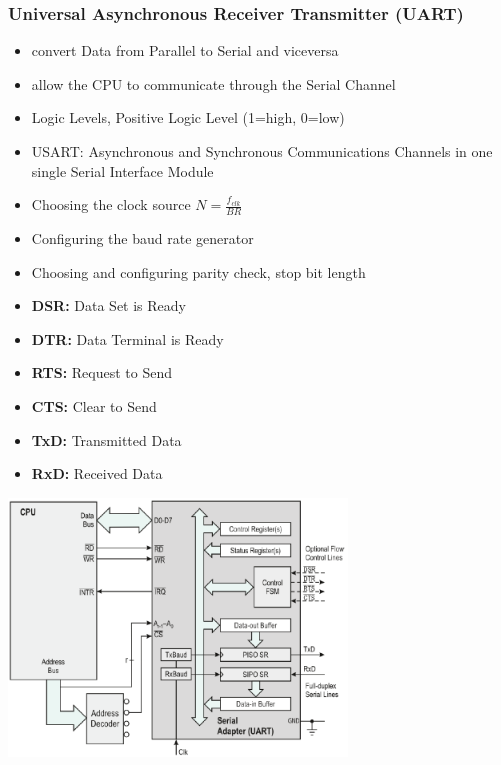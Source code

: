 \subsubsection{Universal Asynchronous Receiver Transmitter (UART)}
\begin{minipage}{10cm}
	\begin{itemize}
		\item convert Data from Parallel to Serial and viceversa
		\item allow the CPU to communicate through the Serial Channel
		\item Logic Levels, Positive Logic Level (1=high, 0=low)
		\item USART: Asynchronous and Synchronous Communications Channels in one single Serial Interface Module
		\item Choosing the clock source $N=\frac{f_{clk}}{BR}$
		\item Configuring the baud rate generator
		\item Choosing and configuring parity check, stop bit length
		\item \textbf{DSR: }Data Set is Ready
		\item \textbf{DTR: }Data Terminal is Ready
		\item \textbf{RTS: }Request to Send
		\item \textbf{CTS: }Clear to Send
		\item \textbf{TxD: }Transmitted Data
		\item \textbf{RxD: }Received Data
	\end{itemize}
\end{minipage}
\begin{minipage}{9cm}
	\includegraphics[width=9cm]{images/uart.png}
\end{minipage}
\clearpage
\pagebreak
